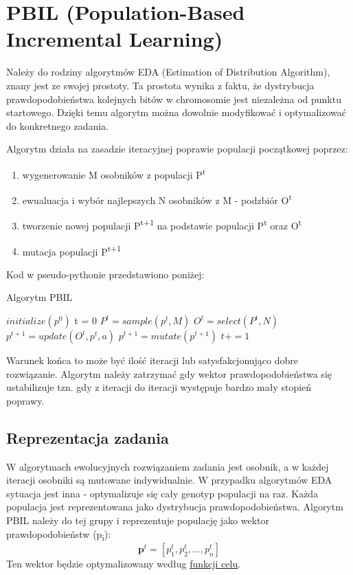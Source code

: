 \documentclass[11pt]{article}
\begin{document}
\pagebreak
\section{PBIL (Population-Based Incremental Learning)}
\label{sec:org5c31017}
Należy do rodziny algorytmów EDA (Estimation of Distribution Algorithm), znany jest ze swojej prostoty. Ta prostota wynika z faktu, że dystrybucja prawdopodobieństwa kolejnych bitów w chromosomie jest niezależna od punktu startowego. Dzięki temu algorytm można dowolnie modyfikować i optymalizować do konkretnego zadania.

Algorytm działa na zasadzie iteracyjnej poprawie populacji początkowej poprzez:
\begin{enumerate}
\item wygenerowanie M osobników z populacji P\textsuperscript{t}
\item ewualuacja i wybór najlepszych N osobników z M - podzbiór O\textsuperscript{t}
\item tworzenie nowej populacji P\textsuperscript{t+1} na podstawie populacji P\textsuperscript{t} oraz O\textsuperscript{t}
\item mutacja populacji P\textsuperscript{t+1}
\end{enumerate}
Kod w pseudo-pythonie przedstawiono poniżej:
\begin{algorithm}[h]
\caption{Algorytm PBIL}
\begin{algorithmic}
\State $initialize(p^0)$
\State t = 0
\State $P^t = sample(p^t,M)$
\State $O^t = select(P^t,N)$
\State $p^{t+1} = update(O^t,p^t,a)$
\State $p^{t+1} = mutate(p^{t+1})$
\State $t += 1$
\EndWhile
\end{algorithmic}
\end{algorithm}

Warunek końca to może być ilość iteracji lub satysfakcjonująco dobre rozwiązanie. Algorytm należy zatrzymać gdy wektor prawdopodobieństwa się ustabilizuje tzn. gdy z iteracji do iteracji występuje bardzo mały stopień poprawy.
\subsection{Reprezentacja zadania}
\label{sec:org0be5ed0}
W algorytmach ewolucyjnych rozwiązaniem zadania jest osobnik, a w każdej iteracji osobniki są mutowane indywidualnie. W przypadku algorytmów EDA sytuacja jest inna - optymalizuje się cały genotyp populacji na raz. Każda populacja jest reprezentowana jako dystrybucja prawdopodobieństwa. Algorytm PBIL należy do tej grupy i reprezentuje populację jako wektor prawdopodobieństw (p\textsubscript{i}):
\[
        \boldsymbol{p}^t = [p_1^t, p_2^t, \dots, p_n^t]
\]
Ten wektor będzie optymalizowany według \uline{\hyperref[sec:orgfed3d26]{funkcji celu}}.
\end{document}
